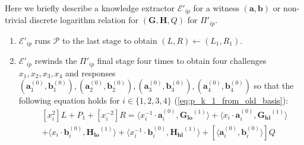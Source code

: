 \documentclass[../lecture-notes-148x210.tex]{subfiles}
\begin{document}
Here we briefly describe a knowledge extractor $\mathcal{E}'_{ip}$ for a witness $(\mathbf{a}, \mathbf{b})$ or non-trivial discrete logarithm relation for $(\mathbf{G, H}, Q)$ for $\Pi'_{ip}$. 
\begin{enumerate}
    \item $\mathcal{E}'_{ip}$ runs $\mathcal{P}$ to the last stage to obtain $(L, R) \gets (L_1, R_1)$.
    \item $\mathcal{E}'_{ip}$ rewinds the $\Pi'_{ip}$ final stage four times to obtain four challenges $x_1, x_2, x_3, x_4$ and responses $(\mathbf{a}_1^{(0)}, \mathbf{b}_1^{(0)}), (\mathbf{a}_2^{(0)}, \mathbf{b}_2^{(0)}), (\mathbf{a}_3^{(0)}, \mathbf{b}_3^{(0)}), (\mathbf{a}_4^{(0)}, \mathbf{b}_4^{(0)})$ so that the following equation holds for $i \in \{ 1,2,3,4 \}$ (\ref{eq:p_k_1_from_old_basis}):
    \begin{equation}
        \begin{aligned}
            & [x_i^2]L + P_1 + [x_i^{-2}]R = \langle x_i^{-1} \cdot \mathbf{a}_i^{(0)}, \mathbf{G_{lo}}^{(1)} \rangle + \langle x_i \cdot \mathbf{a}_i^{(0)}, \mathbf{G_{hi}}^{(1)} \rangle \\
            &+ \langle x_i \cdot \mathbf{b}_i^{(0)}, \mathbf{H_{lo}}^{(1)} \rangle + \langle x_i^{-1} \cdot \mathbf{b}_i^{(0)}, \mathbf{H_{hi}}^{(1)} \rangle + [\langle \mathbf{a}_i^{(0)}, \mathbf{b}_i^{(0)} \rangle]Q
        \end{aligned}
        \label{eq:extractor_eq}
    \end{equation}


\end{enumerate}
\end{document}
